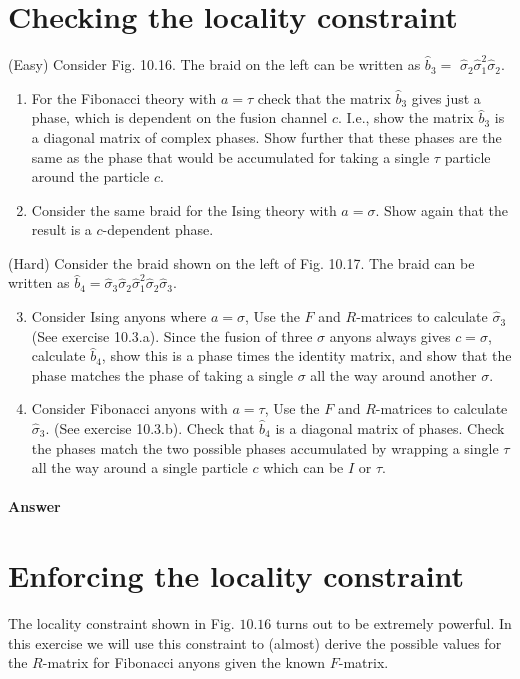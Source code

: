 \documentclass{book}
\begin{document}
\section{Checking the locality constraint}
(Easy) Consider Fig. 10.16. The braid on the left can be written as $\hat{b}_{3} =$ $\hat{\sigma }_{2}\hat{\sigma }_{1}^{2}\hat{\sigma }_{2}$.
\begin{enumerate}
\item For the Fibonacci theory with $a=\tau $ check that the matrix $\hat{b}_{3}$ gives just a phase, which is dependent on the fusion channel $c$. I.e., show the matrix $\hat{b}_{3}$ is a diagonal matrix of complex phases. Show further that these phases are the same as the phase that would be accumulated for taking a single $\tau $ particle around the particle $c$.
\item Consider the same braid for the Ising theory with $a=\sigma $. Show again that the result is a $c$-dependent phase.
\end{enumerate}

\noindent (Hard) Consider the braid shown on the left of Fig. 10.17. The braid can be written as $\hat{b}_{4} =\hat{\sigma }_{3}\hat{\sigma }_{2}\hat{\sigma }_{1}^{2}\hat{\sigma }_{2}\hat{\sigma }_{3}$.

\begin{enumerate}
\setcounter{enumi}{2}
\item Consider Ising anyons where $a=\sigma $, Use the $F$ and $R$-matrices to calculate $\hat{\sigma }_{3}$ (See exercise 10.3.a). Since the fusion of three $\sigma $ anyons always gives $c=\sigma $, calculate $\hat{b}_{4}$, show this is a phase times the identity matrix, and show that the phase matches the phase of taking a single $\sigma $ all the way around another $\sigma $.
\item Consider Fibonacci anyons with $a=\tau $, Use the $F$ and $R$-matrices to calculate $\hat{\sigma }_{3}$. (See exercise 10.3.b). Check that $\hat{b}_{4}$ is a diagonal matrix of phases. Check the phases match the two possible phases accumulated by wrapping a single $\tau $ all the way around a single particle $c$ which can be $I$ or $\tau $.
\end{enumerate}

\paragraph{Answer}


\section{Enforcing the locality constraint}
The locality constraint shown in Fig. $10.16$ turns out to be extremely powerful. In this exercise we will use this constraint to (almost) derive the possible values for the $R$-matrix for Fibonacci anyons given the known $F$-matrix.
\end{document}
